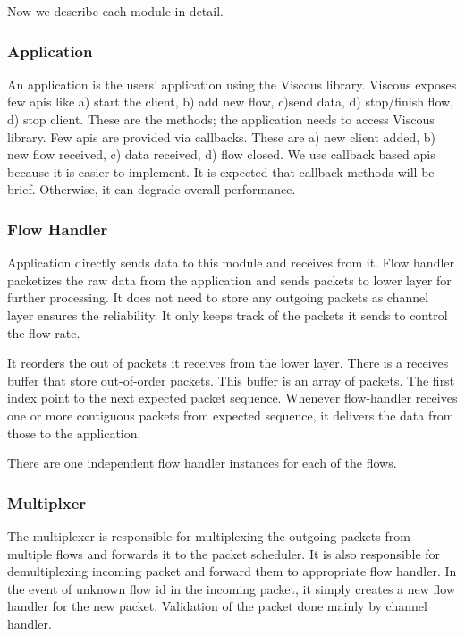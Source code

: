 Now we describe each module in detail.

\subsubsection{Application}
An application is the users' application using the Viscous library. Viscous exposes few \acrshort{api}s like a) start the client, b) add new flow, c)send data, d) stop/finish flow, d) stop client. These are the methods; the application needs to access Viscous library. Few \acrshort{api}s are provided via callbacks. These are a) new client added, b) new flow received, c) data received, d) flow closed. We use callback based \acrshort{api}s because it is easier to implement. It is expected that callback methods will be brief. Otherwise, it can degrade overall performance.


\subsubsection{Flow Handler}
Application directly sends data to this module and receives from it. Flow handler packetizes the raw data from the application and sends packets to lower layer for further processing. It does not need to store any outgoing packets as channel layer ensures the reliability. It only keeps track of the packets it sends to control the flow rate.

It reorders the out of packets it receives from the lower layer. There is a receives buffer that store out-of-order packets. This buffer is an array of packets. The first index point to the next expected packet sequence. Whenever flow-handler receives one or more contiguous packets from expected sequence, it delivers the data from those to the application.

There are one independent flow handler instances for each of the flows.

\subsubsection{Multiplxer}
The multiplexer is responsible for multiplexing the outgoing packets from multiple flows and forwards it to the packet scheduler. It is also responsible for demultiplexing incoming packet and forward them to appropriate flow handler. In the event of unknown flow id in the incoming packet, it simply creates a new flow handler for the new packet. Validation of the packet done mainly by channel handler.

